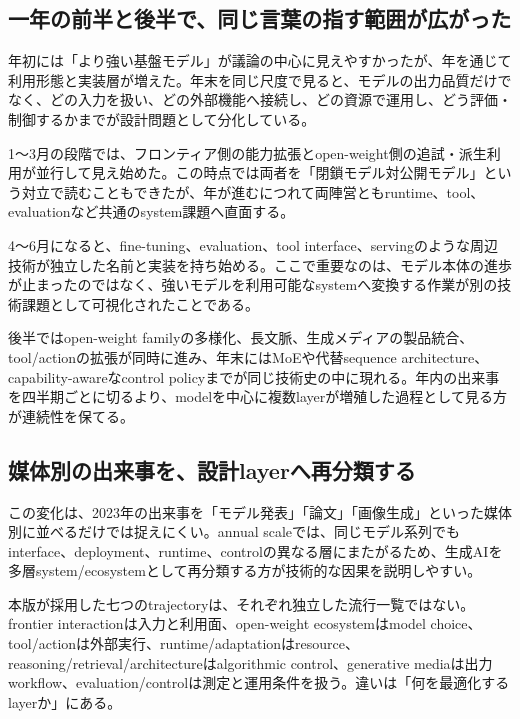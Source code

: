 
\subsection{一年の前半と後半で、同じ言葉の指す範囲が広がった}

年初には「より強い基盤モデル」が議論の中心に見えやすかったが、年を通じて利用形態と実装層が増えた。年末を同じ尺度で見ると、モデルの出力品質だけでなく、どの入力を扱い、どの外部機能へ接続し、どの資源で運用し、どう評価・制御するかまでが設計問題として分化している。


1〜3月の段階では、フロンティア側の能力拡張とopen-weight側の追試・派生利用が並行して見え始めた。この時点では両者を「閉鎖モデル対公開モデル」という対立で読むこともできたが、年が進むにつれて両陣営ともruntime、tool、evaluationなど共通のsystem課題へ直面する。


4〜6月になると、fine-tuning、evaluation、tool interface、servingのような周辺技術が独立した名前と実装を持ち始める。ここで重要なのは、モデル本体の進歩が止まったのではなく、強いモデルを利用可能なsystemへ変換する作業が別の技術課題として可視化されたことである。


後半ではopen-weight familyの多様化、長文脈、生成メディアの製品統合、tool/actionの拡張が同時に進み、年末にはMoEや代替sequence architecture、capability-awareなcontrol policyまでが同じ技術史の中に現れる。年内の出来事を四半期ごとに切るより、modelを中心に複数layerが増殖した過程として見る方が連続性を保てる。


\subsection{媒体別の出来事を、設計layerへ再分類する}

この変化は、2023年の出来事を「モデル発表」「論文」「画像生成」といった媒体別に並べるだけでは捉えにくい。annual scaleでは、同じモデル系列でもinterface、deployment、runtime、controlの異なる層にまたがるため、生成AIを多層system/ecosystemとして再分類する方が技術的な因果を説明しやすい。


本版が採用した七つのtrajectoryは、それぞれ独立した流行一覧ではない。frontier interactionは入力と利用面、open-weight ecosystemはmodel choice、tool/actionは外部実行、runtime/adaptationはresource、reasoning/retrieval/architectureはalgorithmic control、generative mediaは出力workflow、evaluation/controlは測定と運用条件を扱う。違いは「何を最適化するlayerか」にある。


